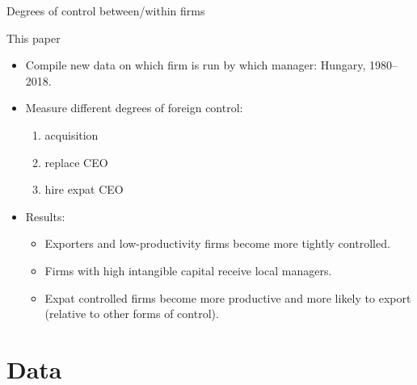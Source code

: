 \documentclass[
  ignorenonframetext,
  aspectratio=43,
]{beamer}
\providecommand{\tightlist}{%
  \setlength{\itemsep}{0pt}\setlength{\parskip}{0pt}}
\begin{document}
\begin{frame}{Degrees of control between/within firms}
\protect\hypertarget{degrees-of-control-betweenwithin-firms}{}
\end{frame}

\begin{frame}{This paper}
\protect\hypertarget{this-paper}{}
\begin{itemize}
\tightlist
\item
  Compile new data on which firm is run by which manager: Hungary,
  1980--2018.
\item
  Measure different degrees of foreign control:

  \begin{enumerate}
  \tightlist
  \item
    acquisition
  \item
    replace CEO
  \item
    hire expat CEO
  \end{enumerate}
\item
  Results:

  \begin{itemize}
  \tightlist
  \item
    Exporters and low-productivity firms become more tightly controlled.
  \item
    Firms with high intangible capital receive local managers.
  \item
    Expat controlled firms become more productive and more likely to
    export (relative to other forms of control).
  \end{itemize}
\end{itemize}
\end{frame}

\hypertarget{data}{%
\section{Data}\label{data}}
\end{document}
